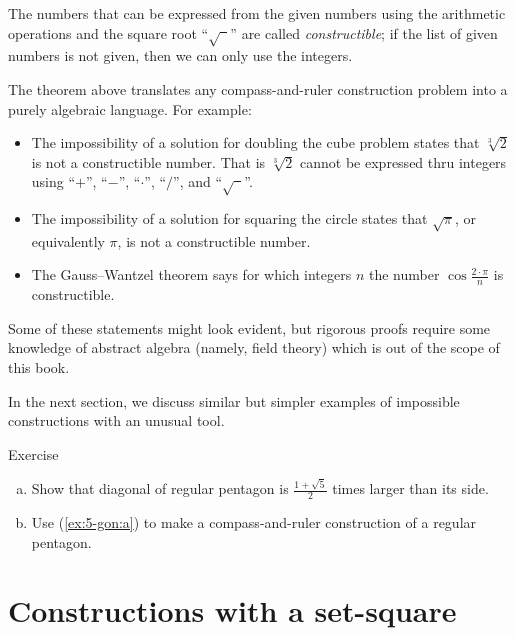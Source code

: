 The numbers that can be expressed from the given numbers using the arithmetic operations and the square root ``$\sqrt{\phantom{a}}$'' are called \emph{constructible};
if the list of given numbers is not given, then we can only use the integers.

{\sloppy
The theorem above translates any compass-and-ruler construction problem into a purely algebraic language.
For example:
\begin{itemize}
\item The impossibility of a solution for doubling the cube problem states that $\sqrt[3]{2}$ is not a constructible number.
That is $\sqrt[3]{2}$ cannot be expressed thru integers using
``$+$'', ``$-$'', ``$\cdot$'', ``$/$'', and ``$\sqrt{\phantom{a}}$''.

\item The impossibility of a solution for squaring the circle states that 
$\sqrt{\pi}$, or equivalently $\pi$, is not a constructible number.

\item The Gauss--Wantzel theorem says for which integers $n$ the number 
$\cos\tfrac{2\cdot\pi}n$ is constructible.
\end{itemize} 
Some of these statements might look evident, 
but rigorous proofs require some knowledge of abstract algebra (namely, field theory)
which is out of the scope of this book. 

}

In the next section, we discuss similar but simpler examples of impossible constructions with an unusual tool.

\begin{thm}{Exercise}\label{ex:5-gon}
\begin{enumerate}[(a)]
 \item\label{ex:5-gon:a} Show that diagonal of regular pentagon is $\tfrac{1+\sqrt5}2$ times larger than its side.
 \item\label{ex:5-gon:b} Use (\ref{ex:5-gon:a}) to make a compass-and-ruler construction of a regular pentagon.
\end{enumerate}
\end{thm}

\section*{Constructions with a set-square}

